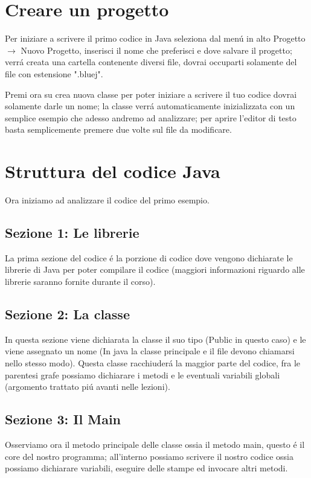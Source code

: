 \documentclass{article}
\begin{document}
\section{Creare un progetto}
\noindent Per iniziare a scrivere il primo codice in Java seleziona dal menú in alto Progetto $\to$ Nuovo Progetto, inserisci il nome che preferisci e dove salvare il progetto; verrá creata una cartella contenente diversi file, dovrai occuparti solamente del file con estensione ".bluej".

\noindent Premi ora su crea nuova classe per poter iniziare a scrivere il tuo codice dovrai solamente darle un nome; la classe verrá automaticamente inizializzata con un semplice esempio che adesso andremo ad analizzare; per aprire l'editor di testo basta semplicemente premere due volte sul file da modificare.

\section{Struttura del codice Java}

\noindent Ora iniziamo ad analizzare il codice del primo esempio.
\subsection{Sezione 1: Le librerie}
    \noindent La prima sezione del codice é la porzione di codice dove vengono dichiarate le librerie di Java per poter compilare il codice (maggiori informazioni riguardo alle librerie saranno fornite durante il corso).

\subsection{Sezione 2: La classe}
    \noindent In questa sezione viene dichiarata la classe il suo tipo (Public in questo caso) e le viene assegnato un nome (In java la classe principale e il file devono chiamarsi nello stesso modo). Questa classe racchiuderá la maggior parte del codice, fra le parentesi grafe possiamo dichiarare i metodi e le eventuali variabili globali (argomento trattato piú avanti nelle lezioni).
    
\subsection{Sezione 3: Il Main}
    \noindent Osserviamo ora il metodo principale delle classe ossia il metodo main, questo é il core del nostro programma; all'interno possiamo scrivere il nostro codice ossia possiamo dichiarare variabili, eseguire delle stampe ed invocare altri metodi.
    
\end{document}
